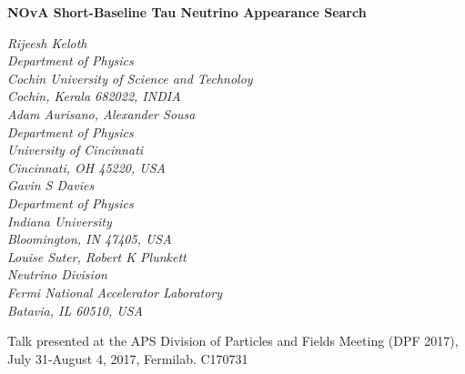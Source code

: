 \documentclass[12pt]{article}
\def\Title#1{\begin{center} {\Large {\bf #1} } \end{center}}
\begin{document}
\Title{NOvA Short-Baseline Tau Neutrino Appearance Search}

\bigskip\bigskip


\begin{raggedright}  

{\it Rijeesh Keloth\\
Department of Physics\\
Cochin University of Science and Technoloy\\
Cochin, Kerala 682022, INDIA\\
\bigskip\bigskip
\it Adam Aurisano, Alexander Sousa\\
Department of Physics\\
University of Cincinnati\\
Cincinnati, OH 45220, USA\\
\bigskip\bigskip
\it Gavin S Davies\\
Department of Physics\\
Indiana University\\
Bloomington, IN 47405, USA\\
\bigskip\bigskip
\it Louise Suter, Robert K Plunkett\\
Neutrino Division\\
Fermi National Accelerator Laboratory\\
Batavia, IL 60510, USA\\
}
\end{raggedright}

\begin{center}
Talk presented at the APS Division of Particles and Fields Meeting (DPF 2017), July 31-August 4, 2017, Fermilab. C170731
\end{center}
\end{document}
